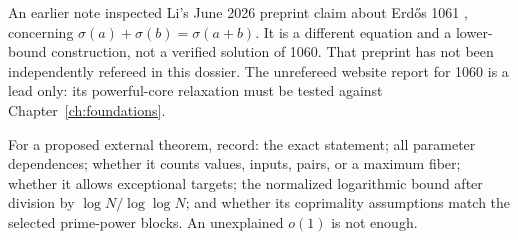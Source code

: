 An earlier note inspected Li's June 2026 preprint claim about Erd\H{o}s 1061
\cite{li2026}, concerning $\sigma(a)+\sigma(b)=\sigma(a+b)$. It is a different
equation and a lower-bound construction, not a verified solution of 1060.
That preprint has not been independently refereed in this dossier.
The unrefereed website report for 1060 is a lead only: its powerful-core relaxation
must be tested against Chapter~\ref{ch:foundations}.

For a proposed external theorem, record: the exact statement; all parameter
dependences; whether it counts values, inputs, pairs, or a maximum fiber; whether
it allows exceptional targets; the normalized logarithmic bound after division
by $\log N/\log\log N$; and whether its coprimality assumptions match the selected
prime-power blocks. An unexplained $o(1)$ is not enough.
